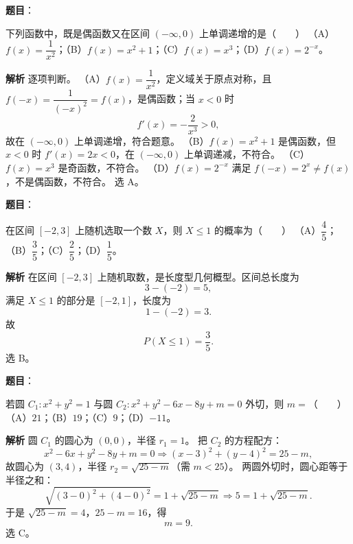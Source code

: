\begin{answer}

\textbf{题目}：

下列函数中，既是偶函数又在区间 $(-\infty,0)$ 上单调递增的是\mbox{（　　）}
（A）$f(x)=\dfrac1{x^2}$；（B）$f(x)=x^2+1$；（C）$f(x)=x^3$；（D）$f(x)=2^{-x}$。

\textbf{解析}
逐项判断。
（A）$f(x)=\dfrac1{x^2}$，定义域关于原点对称，且 $f(-x)=\dfrac1{(-x)^2}=f(x)$，是偶函数；当 $x<0$ 时
\nopagebreak[4]
\[f'(x)=-\frac2{x^3}>0,\]
故在 $(-\infty,0)$ 上单调递增，符合题意。
（B）$f(x)=x^2+1$ 是偶函数，但 $x<0$ 时 $f'(x)=2x<0$，在 $(-\infty,0)$ 上单调递减，不符合。
（C）$f(x)=x^3$ 是奇函数，不符合。
（D）$f(x)=2^{-x}$ 满足 $f(-x)=2^{x}\neq f(x)$，不是偶函数，不符合。
选 A。


\end{answer}
\begin{answer}

\textbf{题目}：

在区间 $[-2,3]$ 上随机选取一个数 $X$，则 $X\leqslant1$ 的概率为\mbox{（　　）}
（A）$\dfrac45$；（B）$\dfrac35$；（C）$\dfrac25$；（D）$\dfrac15$。

\textbf{解析}
在区间 $[-2,3]$ 上随机取数，是长度型几何概型。区间总长度为
\nopagebreak[4]
\[3-(-2)=5,\]
满足 $X\leqslant1$ 的部分是 $[-2,1]$，长度为
\nopagebreak[4]
\[1-(-2)=3.\]
故
\nopagebreak[4]
\[P(X\leqslant1)=\frac35 .\]
选 B。


\end{answer}
\begin{answer}

\textbf{题目}：

若圆 $C_1:x^2+y^2=1$ 与圆 $C_2:x^2+y^2-6x-8y+m=0$ 外切，则 $m=$\mbox{（　　）}
（A）$21$；（B）$19$；（C）$9$；（D）$-11$。

\textbf{解析}
圆 $C_1$ 的圆心为 $(0,0)$，半径 $r_1=1$。
把 $C_2$ 的方程配方：
\nopagebreak[4]
\[x^2-6x+y^2-8y+m=0\Longrightarrow(x-3)^2+(y-4)^2=25-m,\]
故圆心为 $(3,4)$，半径 $r_2=\sqrt{25-m}$（需 $m<25$）。
两圆外切时，圆心距等于半径之和：
\nopagebreak[4]
\[\sqrt{(3-0)^2+(4-0)^2}=1+\sqrt{25-m}\Longrightarrow5=1+\sqrt{25-m}.\]
于是 $\sqrt{25-m}=4$，$25-m=16$，得
\nopagebreak[4]
\[m=9 .\]
选 C。


\end{answer}

